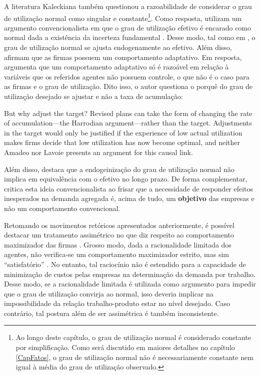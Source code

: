 A literatura Kaleckiana também questionou a razoabilidade de considerar o grau de utilização normal como singular e constante\footnote{Ao longo deste capítulo, o grau de utilização normal é considerado constante por simplificação. Como será discutido em maiores detalhes no capítulo \ref{CapFatos}, o grau de utilização normal não é necessariamente constante nem igual à média do grau de utilização observado.}. Como resposta, utilizam um argumento convencionalista em que o grau de utilização efetivo é encarado como normal dada a existência da incerteza fundamental \cite{lavoie_kaleckian_1995}. Desse modo, tal como em \textcite{amadeo_role_1986}, o grau de utilização normal se ajusta endogenamente ao efetivo. Além disso, afirmam que as firmas possuem um comportamento adaptativo. Em resposta, \textcite{skott_theoretical_2012} argumenta que um comportamento adaptativo só é razoável em relação à variáveis que os referidos agentes não possuem controle, o que não é o caso para as firmas e o grau de utilização. Dito isso, o autor questiona o porquê do grau de utilização desejado se ajustar e não a taxa de acumulação:

\begin{citacao}
But why adjust the target? Revised plans can take the form of changing the rate of accumulation—the Harrodian argument—rather than the target. Adjustments in the target would only be justified if the experience of low actual utilization makes firms decide that low utilization has now become optimal, and neither Amadeo nor Lavoie presents an argument for this causal link. \cite[p.120]{skott_theoretical_2012}
\end{citacao}
Além disso, destaca que a endogeinização do grau de utilização normal não implica em equivalência com o efetivo no longo prazo. De forma complementar, \textcite{nikiforos_utilization_2016} critica esta ideia convencionalista ao frisar que a necessidade de responder efeitos inesperados na demanda agregada é, acima de tudo, um \textbf{objetivo} das empresas e não um comportamento convencional. 

Retomando os movimentos retóricos apresentados anteriormente, é possível destacar um tratamento assimétrico no que diz respeito ao comportamento maximizador das firmas \cite[p.~123]{skott_theoretical_2012}. Grosso modo, dada a racionalidade limitada dos agentes, não verifica-se um comportamento maximizador estrito, mas sim ``satisfatório''  \cite{dutt_equilibrium_2010}. No entanto, tal raciocínio não é estendido para a capacidade de minimização de custos pelas empresas na determinação da demanda por trabalho. Desse modo, se a racionalidade limitada é utilizada como argumento para impedir que o grau de utilização convirja ao normal, isso deveria implicar na impossibilidade da relação trabalho-produto estar no nível desejado. Caso contrário, tal postura além de ser assimétrica é também inconsistente.

